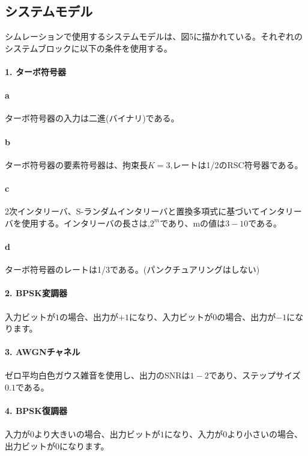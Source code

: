 \documentclass[20 pts]{article}
\begin{document}
\subsection{システムモデル}
シムレーションで使用するシステムモデルは、図5に描かれている。それぞれのシステムブロックに以下の条件を使用する。
\paragraph{1. \textbf{ターボ符号器}}
\paragraph{a}
ターボ符号器の入力は二進(バイナリ)である。
\paragraph{b}
ターボ符号器の要素符号器は、拘束長$K=3$,レートは1/2のRSC符号器である。
\paragraph{c}
2次インタリーバ、S-ランダムインタリーバと置換多項式に基づいてインタリーバを使用する。インタリーバの長さは,$2^m$であり、mの値は$3 - {10}$である。
\paragraph{d}
ターボ符号器のレートは1/3である。(パンクチュアリングはしない)
\paragraph{2. BPSK変調器}\paragraph{}
入力ビットが$1$の場合、出力が$+1$になり、入力ビットが$0$の場合、出力が$-1$になります。
\paragraph{3. AWGNチャネル}\paragraph{}
ゼロ平均白色ガウス雑音を使用し、出力のSNRは$1-2$であり、ステップサイズ$0.1$である。
\paragraph{4. BPSK復調器}\paragraph{}
入力が$0$より大きいの場合、出力ビットが$1$になり、入力が$0$より小さいの場合、出力ビットが$0$になります。
\end{document}
